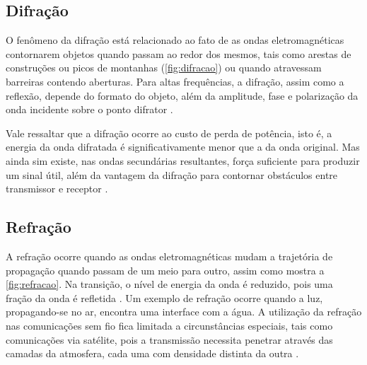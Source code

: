 \subsection{Difração}
\label{sub:difracao}

O fenômeno da difração está relacionado ao fato de as ondas eletromagnéticas contornarem objetos quando passam ao redor dos mesmos, tais como arestas de construções ou picos de montanhas (\autoref{fig:difracao}) ou quando atravessam barreiras contendo aberturas. Para altas frequências, a difração, assim como a reflexão, depende do formato do objeto, além da amplitude, fase e polarização da onda incidente sobre o ponto difrator \cite{rappaport2009}.

\begin{figure}[H]
	\centering
\end{figure}

Vale ressaltar que a difração ocorre ao custo de perda de potência, isto é, a energia da onda difratada é significativamente menor que a da onda original. Mas ainda sim existe, nas ondas secundárias resultantes, força suficiente para produzir um sinal útil, além da vantagem da difração para contornar obstáculos entre transmissor e receptor \cite{flickenger2008,rappaport2009}.

\subsection{Refração}
\label{sub:refracao}

A refração ocorre quando as ondas eletromagnéticas mudam a trajetória de propagação quando passam de um meio para outro, assim como mostra a \autoref{fig:refracao}. Na transição, o nível de energia da onda é reduzido, pois uma fração da onda é refletida \cite{flickenger2008}. Um exemplo de refração ocorre quando a luz, propagando-se no ar, encontra uma interface com a água. A utilização da refração nas comunicações sem fio fica limitada a circunstâncias especiais, tais como comunicações via satélite, pois a transmissão necessita penetrar através das camadas da atmosfera, cada uma com densidade distinta da outra \cite{rappaport2009}.

